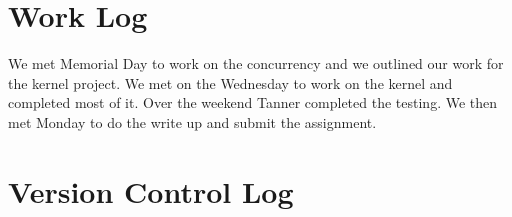 \documentclass[letterpaper,10pt,serif,draftclsnofoot,onecolumn,compsoc,titlepage]{IEEEtran}
\begin{document}
\section{Work Log}
We met Memorial Day to work on the concurrency and we outlined our work for the kernel project.
We met on the Wednesday to work on the kernel and completed most of it. Over the weekend Tanner 
completed the testing. We then met Monday to do the write up and submit the assignment. 
\section{Version Control Log}
\end{document}
